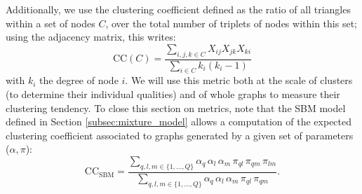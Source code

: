 \documentclass[switch, 12pt]{article}
\newcommand{\intset}[2]{\{#1, ..., #2\}}
\begin{document}
\begin{multicols}{2}
    Additionally, we use the clustering coefficient defined as the ratio of all triangles within a set of nodes $C$, over the total number of triplets of nodes within this set; using the adjacency matrix, this writes:
    \begin{equation}
        \mathrm{CC}(C) = \frac{\displaystyle \sum_{i, j, k \in C} X_{ij} X_{jk} X_{ki}}{\displaystyle
            \sum_{i \in C} k_i (k_i - 1)}
    \end{equation}
    with $k_i$ the degree of node $i$. We will use this metric both at the scale of clusters (to determine their individual qualities) and of whole graphs to measure their clustering tendency. To close this section on metrics, note that the SBM model defined in Section \ref{subsec:mixture_model} allows a computation of the expected clustering coefficient associated to graphs generated by a given set of parameters ($\alpha, \pi$):
    \begin{equation}
        \mathrm{CC}_{\mathrm{SBM}} = \frac{\displaystyle  \sum_{q, l, m \in \intset{1}{Q}} \alpha_q \, \alpha_l \, \alpha_m \, \pi_{ql} \, \pi_{qm} \, \pi_{lm}}{\displaystyle  \sum_{q, l, m \in \intset{1}{Q}} \alpha_q \, \alpha_l \, \alpha_m \, \pi_{ql} \, \pi_{qm}}.
    \end{equation}



\end{multicols}
\end{document}
